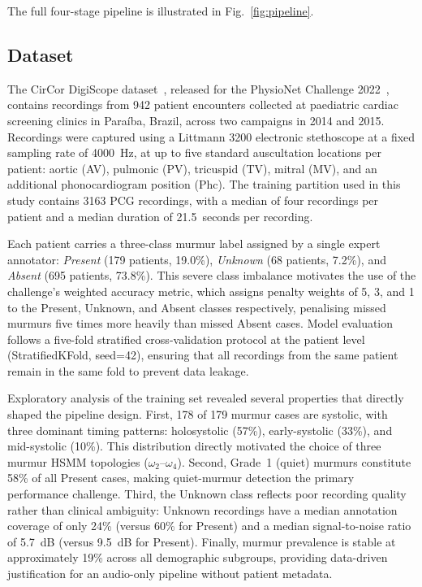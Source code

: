 \documentclass[conference]{IEEEtran}
\begin{document}
The full four-stage pipeline is illustrated in Fig.~\ref{fig:pipeline}.

\subsection{Dataset}

The CirCor DigiScope dataset~\cite{oliveira2021}, released for the
PhysioNet Challenge 2022~\cite{reyna2023}, contains recordings from
942 patient encounters collected at paediatric cardiac screening
clinics in Para\'{i}ba, Brazil, across two campaigns in 2014 and 2015.
Recordings were captured using a Littmann 3200 electronic stethoscope
at a fixed sampling rate of 4000~Hz, at up to five standard auscultation
locations per patient: aortic (AV), pulmonic (PV), tricuspid (TV),
mitral (MV), and an additional phonocardiogram position (Phc).
The training partition used in this study contains 3163 PCG recordings,
with a median of four recordings per patient and a median duration of
21.5~seconds per recording.

Each patient carries a three-class murmur label assigned by a single
expert annotator: \textit{Present} (179 patients, 19.0\%),
\textit{Unknown} (68 patients, 7.2\%), and \textit{Absent}
(695 patients, 73.8\%). This severe class imbalance motivates the use
of the challenge's weighted accuracy metric, which assigns penalty
weights of 5, 3, and 1 to the Present, Unknown, and Absent classes
respectively, penalising missed murmurs five times more heavily than
missed Absent cases. Model evaluation follows a five-fold stratified
cross-validation protocol at the patient level (StratifiedKFold,
seed=42), ensuring that all recordings from the same patient remain
in the same fold to prevent data leakage.

Exploratory analysis of the training set revealed several properties
that directly shaped the pipeline design. First, 178 of 179 murmur cases
are systolic, with three dominant timing patterns: holosystolic (57\%),
early-systolic (33\%), and mid-systolic (10\%). This distribution
directly motivated the choice of three murmur HSMM topologies
($\omega_2$--$\omega_4$). Second, Grade~1 (quiet) murmurs constitute
58\% of all Present cases, making quiet-murmur detection the primary
performance challenge. Third, the Unknown class reflects poor
recording quality rather than clinical ambiguity: Unknown recordings
have a median annotation coverage of only 24\% (versus 60\% for
Present) and a median signal-to-noise ratio of 5.7~dB (versus 9.5~dB
for Present). Finally, murmur prevalence is stable at approximately
19\% across all demographic subgroups, providing data-driven
justification for an audio-only pipeline without patient metadata.
\end{document}
